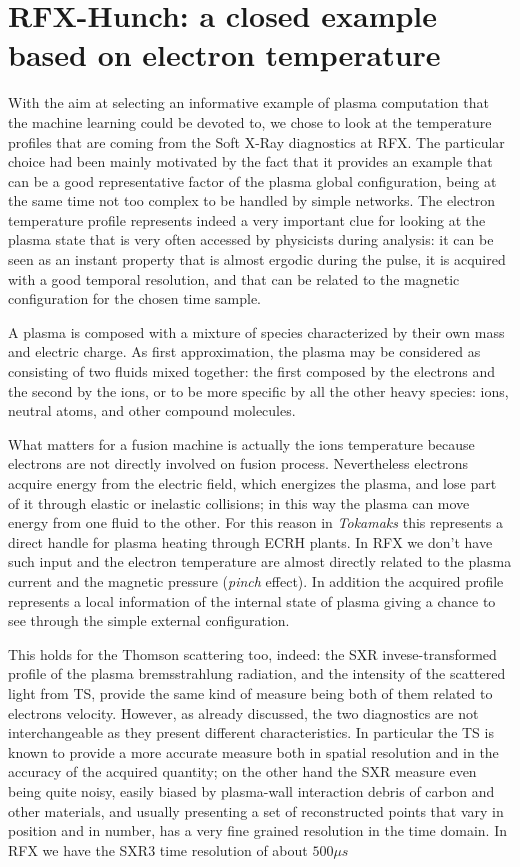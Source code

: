 \chapter{RFX-Hunch: a closed example based on electron temperature}
\label{section:RFXhunch}

With the aim at selecting an informative example of plasma computation that the machine learning could be devoted to, we chose to look at the temperature profiles that are coming from the Soft X-Ray diagnostics at RFX. The particular choice had been mainly motivated by the fact that it provides an example that can be a good representative factor of the plasma global configuration, being at the same time not too complex to be handled by simple networks. The electron temperature profile represents indeed a very important clue for looking at the plasma state that is very often accessed by physicists during analysis: it can be seen as an instant property that is almost ergodic during the pulse, it is acquired with a good temporal resolution, and that can be related to the magnetic configuration for the chosen time sample.

A plasma is composed with a mixture of species characterized by their own mass and electric charge. As first approximation, the plasma may be considered as consisting of two fluids mixed together: the first composed by the electrons and the second by the ions, or to be more specific by all the other heavy species: ions, neutral atoms, and other compound molecules.

What matters for a fusion machine is actually the ions temperature because electrons are not directly involved on fusion process.
Nevertheless electrons acquire energy from the electric field, which energizes the plasma, and lose part of it through elastic or inelastic collisions; in this way the plasma can move energy from one fluid to the other. For this reason in \textit{Tokamaks} this represents a direct handle for plasma heating through \acs{ECRH} plants. In RFX we don't have such input and the electron temperature are almost directly related to the plasma current and the magnetic pressure (\textit{pinch} effect).
In addition the acquired profile represents a local information of the internal state of plasma giving a chance to see through the simple external configuration.

This holds for the Thomson scattering too, indeed: the SXR invese-transformed profile of the plasma bremsstrahlung radiation, and the intensity of the scattered light from TS, provide the same kind of measure being both of them related to electrons velocity.
However, as already discussed, the two diagnostics are not interchangeable as they present different characteristics. In particular the TS is known to provide a more accurate measure both in spatial resolution and in the accuracy of the acquired quantity; on the other hand the SXR measure even being quite noisy, easily biased by plasma-wall interaction debris of carbon and other materials, and usually presenting a set of reconstructed points that vary in position and in number, has a very fine grained resolution in the time domain.
In RFX we have the SXR3 time resolution of about $500 \mu s$



